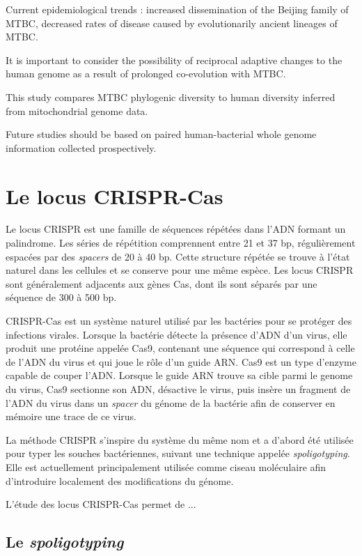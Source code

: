\documentclass[twoside,a4paper,12pt,frenchb,openany]{report}
\begin{document}
Current epidemiological trends : increased dissemination of the Beijing family of MTBC, decreased rates of disease caused by evolutionarily ancient lineages of MTBC.

It is important to consider the possibility of reciprocal adaptive changes to the human genome as a result of prolonged co-evolution with MTBC.

This study compares MTBC phylogenic diversity to human diversity inferred from mitochondrial genome data.

Future studies should be based on paired human-bacterial whole genome information collected prospectively.

\section{Le locus CRISPR-Cas}

Le locus CRISPR est une famille de séquences répétées dans l'ADN formant un palindrome. Les séries de répétition comprennent entre 21 et 37 bp, régulièrement espacées par des \textit{spacers} de 20 à 40 bp. Cette structure répétée se trouve à l'état naturel dans les cellules et se conserve pour une même espèce. Les locus CRISPR sont généralement adjacents aux gènes Cas, dont ils sont séparés par une séquence de 300 à 500 bp.

CRISPR-Cas est un système naturel utilisé par les bactéries pour se protéger des infections virales. Lorsque la bactérie détecte la présence d'ADN d'un virus, elle produit une protéine appelée Cas9, contenant une séquence qui correspond à celle de l'ADN du virus et qui joue le rôle d'un guide ARN. Cas9 est un type d'enzyme capable de couper l'ADN. Lorsque le guide ARN trouve sa cible parmi le genome du virus, Cas9 sectionne son ADN, désactive le virus, puis insère un fragment de l'ADN du virus dans un \textit{spacer} du génome de la bactérie afin de conserver en mémoire une trace de ce virus.

La méthode CRISPR s'inspire du système du même nom et a d'abord été utilisée pour typer les souches bactériennes, suivant une technique appelée \textit{spoligotyping}. Elle est actuellement principalement utilisée comme ciseau moléculaire afin d'introduire localement des modifications du génome.

L'étude des locus CRISPR-Cas permet de ...

\subsection{Le \textit{spoligotyping}}
\end{document}
